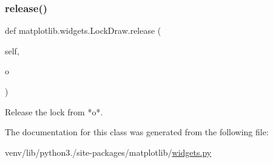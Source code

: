 \subsubsection{\texorpdfstring{release()}{release()}}
{\footnotesize\ttfamily def matplotlib.\+widgets.\+Lock\+Draw.\+release (\begin{DoxyParamCaption}\item[{}]{self,  }\item[{}]{o }\end{DoxyParamCaption})}

\begin{DoxyVerb}Release the lock from *o*.\end{DoxyVerb}
 

The documentation for this class was generated from the following file\+:\begin{DoxyCompactItemize}
\item 
venv/lib/python3./site-\/packages/matplotlib/\hyperlink{widgets_8py}{widgets.\+py}\end{DoxyCompactItemize}
